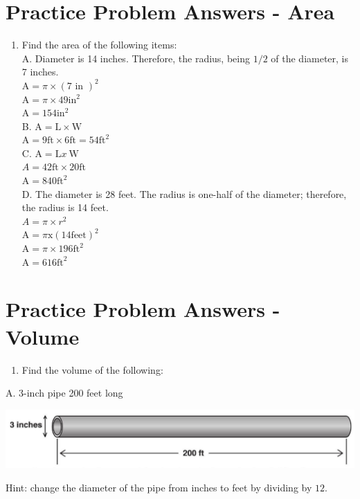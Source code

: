 \documentclass[10pt]{article}
\begin{document}
\section{Practice Problem Answers - Area}
\begin{enumerate}
  \item Find the area of the following items:\\
A. Diameter is 14 inches. Therefore, the radius, being $1 / 2$ of the diameter, is 7 inches.\\
$\mathrm{A}=\pi \times(7 \text { in })^{2}$\\
$\mathrm{A}=\pi \times 49 \mathrm{in}^{2}$\\
$\mathrm{A}=154 \mathrm{in}^{2}$\\
B. $\mathrm{A}=\mathrm{L} \times \mathrm{W}$\\
$\mathrm{A}=9 \mathrm{ft} \times 6 \mathrm{ft}=54 \mathrm{ft}^{2}$\\
C. $\mathrm{A}=\mathrm{L} x \mathrm{~W}$\\
$A=42 \mathrm{ft} \times 20 \mathrm{ft}$\\
$\mathrm{A}=840 \mathrm{ft}^{2}$\\
D. The diameter is 28 feet. The radius is one-half of the diameter; therefore, the radius is 14 feet.\\
$A=\pi \times r^{2}$\\
$\mathrm{A}=\pi \mathrm{x}(14 \mathrm{feet})^{2}$\\
$\mathrm{A}=\pi \times 196 \mathrm{ft}^{2}$\\
$\mathrm{A}=616 \mathrm{ft}^{2}$
\end{enumerate}
\section{Practice Problem Answers - Volume}
\begin{enumerate}
  \item Find the volume of the following:
\end{enumerate}
A. 3-inch pipe 200 feet long

\includegraphics[max width=\textwidth]{2022_09_11_72dbedc910e6e984560cg-63}

Hint: change the diameter of the pipe from inches to feet by dividing by $12 .$
\end{document}

